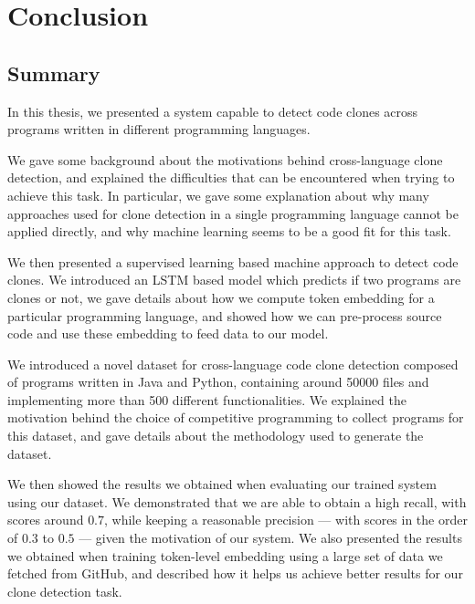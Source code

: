 \chapter{\label{ch:conclusion}Conclusion}
\section{Summary}
In this thesis, we presented a system capable to detect code clones across
programs written in different programming languages.

We gave some background about the motivations behind cross-language clone
detection, and explained the difficulties that can be encountered when trying to
achieve this task. In particular, we gave some explanation about why many
approaches used for clone detection in a single programming language cannot be
applied directly, and why machine learning seems to be a good fit for this task.

We then presented a supervised learning based machine approach to detect
code clones. We introduced an LSTM based model which predicts if two programs
are clones or not, we gave details about how we compute token embedding for
a particular programming language, and showed how we can pre-process source code
and use these embedding to feed data to our model.

We introduced a novel dataset for cross-language code clone
detection composed of programs written in Java and Python, containing around
50000 files and implementing more than 500 different functionalities. We
explained the motivation behind the choice of competitive programming to collect
programs for this dataset, and gave details about the methodology used to
generate the dataset.

We then showed the results we obtained when evaluating our trained system using
our dataset. We demonstrated that we are able to obtain a high recall, with
scores around $0.7$, while keeping a reasonable precision --- with scores in the
order of $0.3$ to $0.5$ --- given the motivation of our system. We also
presented the results we obtained when training token-level embedding using a
large set of data we fetched from GitHub, and described how it helps us achieve
better results for our clone detection task.
